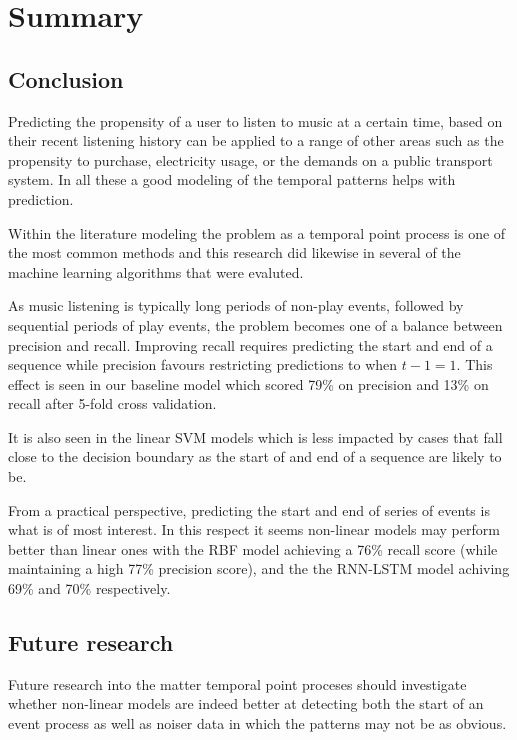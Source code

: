 
\chapter{Summary} %

\label{Chapter6} 

\section{Conclusion}

Predicting the propensity of a user to listen to music at a certain time, based on their recent listening history can be applied to a range of other areas such as the propensity to purchase, electricity usage, or the demands on a public transport system. In all these a good modeling of the temporal patterns helps with prediction.

Within the literature modeling the problem as a temporal point process is one of the most common methods and this research did likewise in several of the machine learning algorithms that were evaluted.

As music listening is typically long periods of non-play events, followed by sequential periods of play events, the problem becomes one of a balance between precision and recall. Improving recall requires predicting the start and end of a sequence while precision favours restricting predictions to when $t-1 = 1$. This effect is seen in our baseline model which scored 79\% on precision and 13\% on recall after 5-fold cross validation.

It is also seen in the linear SVM models which is less impacted by cases that fall close to the decision boundary as the start of and end of a sequence are likely to be.

From a practical perspective, predicting the start and end of series of events is what is of most interest. In this respect it seems non-linear models may perform better than linear ones with the RBF model achieving a 76\% recall score (while maintaining a high 77\% precision score), and the the RNN-LSTM model achiving 69\% and 70\% respectively.

\section{Future research}

Future research into the matter temporal point proceses should investigate whether non-linear models are indeed better at detecting both the start of an event process as well as noiser data in which the patterns may not be as obvious.

